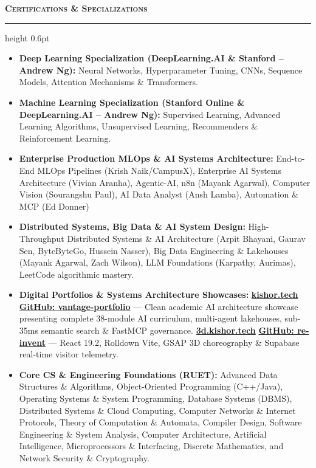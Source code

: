 \documentclass[9.5pt,a4paper]{article}
\newcommand{\resumesection}[1]{%
    \vspace{4.0pt}%
    {\color{burgundy}\scshape\bfseries\fontsize{10.0pt}{11.2pt}\selectfont #1}%
    \vspace{1.0pt}%
    \hrule height 0.6pt\relax%
    \vspace{2.5pt}%
}
\begin{document}
\resumesection{Certifications \& Specializations}
\begin{itemize}
    \item \textbf{Deep Learning Specialization (DeepLearning.AI \& Stanford -- Andrew Ng):} Neural Networks, Hyperparameter Tuning, CNNs, Sequence Models, Attention Mechanisms \& Transformers.
    \item \textbf{Machine Learning Specialization (Stanford Online \& DeepLearning.AI -- Andrew Ng):} Supervised Learning, Advanced Learning Algorithms, Unsupervised Learning, Recommenders \& Reinforcement Learning.
    \item \textbf{Enterprise Production MLOps \& AI Systems Architecture:} End-to-End MLOps Pipelines (Krish Naik/CampusX), Enterprise AI Systems Architecture (Vivian Aranha), Agentic-AI, n8n (Mayank Agarwal), Computer Vision (Sourangshu Paul), AI Data Analyst (Ansh Lamba), Automation \& MCP (Ed Donner)
    \item \textbf{Distributed Systems, Big Data \& AI System Design:} High-Throughput Distributed Systems \& AI Architecture (Arpit Bhayani, Gaurav Sen, ByteByteGo, Hussein Nasser), Big Data Engineering \& Lakehouses (Mayank Agarwal, Zach Wilson), LLM Foundations (Karpathy, Aurimas), LeetCode algorithmic mastery.
    \item \textbf{Digital Portfolios \& Systems Architecture Showcases:} \href{https://kishor.tech/}{\textbf{kishor.tech}} \;\textbar\; \href{https://github.com/KishorKumarParoi/vantage-portfolio}{\textbf{GitHub: vantage-portfolio}} --- Clean academic AI architecture showcase presenting complete 38-module AI curriculum, multi-agent lakehouses, sub-35ms semantic search \& FastMCP governance. \;\textbullet\; \href{https://3d.kishor.tech/}{\textbf{3d.kishor.tech}} \;\textbar\; \href{https://github.com/KishorKumarParoi/re-invent}{\textbf{GitHub: re-invent}} --- React 19.2, Rolldown Vite, GSAP 3D choreography \& Supabase real-time visitor telemetry.
    \item \textbf{Core CS \& Engineering Foundations (RUET):} Advanced Data Structures \& Algorithms, Object-Oriented Programming (C++/Java), Operating Systems \& System Programming, Database Systems (DBMS), Distributed Systems \& Cloud Computing, Computer Networks \& Internet Protocols, Theory of Computation \& Automata, Compiler Design, Software Engineering \& System Analysis, Computer Architecture, Artificial Intelligence, Microprocessors \& Interfacing, Discrete Mathematics, and Network Security \& Cryptography.
\end{itemize}
\end{document}
